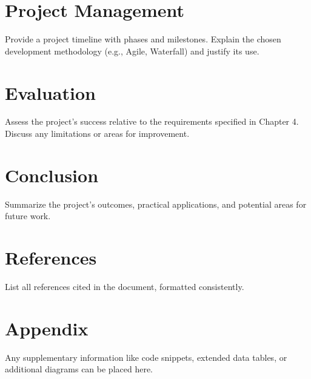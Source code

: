 \documentclass[12pt,a4paper]{report}
\begin{document}
\chapter{Project Management}
Provide a project timeline with phases and milestones. Explain the chosen development methodology (e.g., Agile, Waterfall) and justify its use.

\chapter{Evaluation}
Assess the project’s success relative to the requirements specified in Chapter 4. Discuss any limitations or areas for improvement.

\chapter{Conclusion}
Summarize the project’s outcomes, practical applications, and potential areas for future work.

\chapter*{References}
List all references cited in the document, formatted consistently.

\appendix
\chapter{Appendix}
Any supplementary information like code snippets, extended data tables, or additional diagrams can be placed here.
\end{document}
